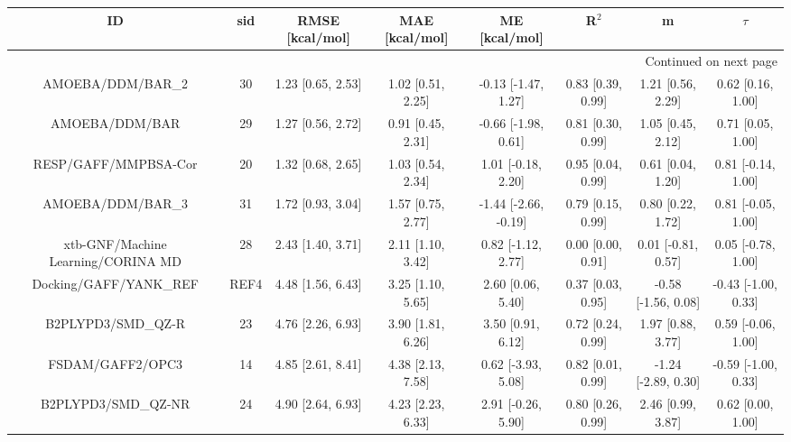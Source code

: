 \documentclass[8pt]{article}
\begin{document}
\begin{center}
\begin{footnotesize}
\begin{longtable}{|cccccccc|}
\toprule
                                 ID &   sid &      RMSE [kcal/mol] &       MAE [kcal/mol] &         ME [kcal/mol] &              R$^2$ &                    m &               $\tau$ \\
\midrule
\endhead
\midrule
\multicolumn{8}{r}{{Continued on next page}} \\
\midrule
\endfoot

\bottomrule
\endlastfoot
                  AMOEBA/DDM/BAR\_2 &    30 &    1.23 [0.65, 2.53] &    1.02 [0.51, 2.25] &   -0.13 [-1.47, 1.27] &  0.83 [0.39, 0.99] &    1.21 [0.56, 2.29] &    0.62 [0.16, 1.00] \\
                     AMOEBA/DDM/BAR &    29 &    1.27 [0.56, 2.72] &    0.91 [0.45, 2.31] &   -0.66 [-1.98, 0.61] &  0.81 [0.30, 0.99] &    1.05 [0.45, 2.12] &    0.71 [0.05, 1.00] \\
               RESP/GAFF/MMPBSA-Cor &    20 &    1.32 [0.68, 2.65] &    1.03 [0.54, 2.34] &    1.01 [-0.18, 2.20] &  0.95 [0.04, 0.99] &    0.61 [0.04, 1.20] &   0.81 [-0.14, 1.00] \\
                  AMOEBA/DDM/BAR\_3 &    31 &    1.72 [0.93, 3.04] &    1.57 [0.75, 2.77] &  -1.44 [-2.66, -0.19] &  0.79 [0.15, 0.99] &    0.80 [0.22, 1.72] &   0.81 [-0.05, 1.00] \\
 xtb-GNF/Machine Learning/CORINA MD &    28 &    2.43 [1.40, 3.71] &    2.11 [1.10, 3.42] &    0.82 [-1.12, 2.77] &  0.00 [0.00, 0.91] &   0.01 [-0.81, 0.57] &   0.05 [-0.78, 1.00] \\
             Docking/GAFF/YANK\_REF &  REF4 &    4.48 [1.56, 6.43] &    3.25 [1.10, 5.65] &     2.60 [0.06, 5.40] &  0.37 [0.03, 0.95] &  -0.58 [-1.56, 0.08] &  -0.43 [-1.00, 0.33] \\
                 B2PLYPD3/SMD\_QZ-R &    23 &    4.76 [2.26, 6.93] &    3.90 [1.81, 6.26] &     3.50 [0.91, 6.12] &  0.72 [0.24, 0.99] &    1.97 [0.88, 3.77] &   0.59 [-0.06, 1.00] \\
                   FSDAM/GAFF2/OPC3 &    14 &    4.85 [2.61, 8.41] &    4.38 [2.13, 7.58] &    0.62 [-3.93, 5.08] &  0.82 [0.01, 0.99] &  -1.24 [-2.89, 0.30] &  -0.59 [-1.00, 0.33] \\
                B2PLYPD3/SMD\_QZ-NR &    24 &    4.90 [2.64, 6.93] &    4.23 [2.23, 6.33] &    2.91 [-0.26, 5.90] &  0.80 [0.26, 0.99] &    2.46 [0.99, 3.87] &    0.62 [0.00, 1.00] \\

\end{longtable}
\end{footnotesize}
\end{center}
\end{document}
